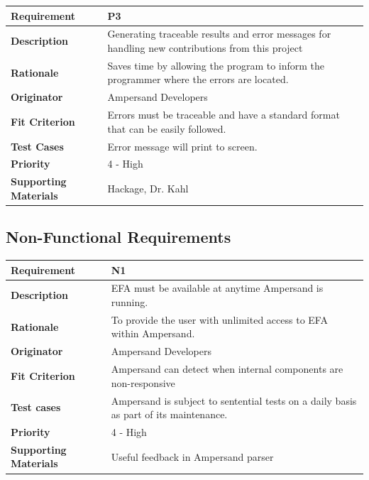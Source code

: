 \documentclass[12pt]{report}
\begin{document}
{\setlength{\tabcolsep}{6pt} %
    \begin{tabularx}{\textwidth}{>{\bfseries}C{3cm}X}
        Requirement & P3 \\ 
        \midrule
        \endhead
        Description  & Generating traceable results and error messages for 
        handling new contributions from this project
        \\	Rationale & Saves time by allowing the program to inform the 
        programmer where the errors are located.
        \\	Originator & Ampersand Developers
        \\	Fit Criterion & Errors must be traceable and have a standard format 
        that can be easily followed.
        \\ Test Cases & Error message will print to screen.
        \\	Priority & 4 - High
        \\	Supporting Materials & Hackage, Dr. Kahl
        \vspace{12pt}
    \end{tabularx}
}

\subsection{Non-Functional Requirements}
{\setlength{\tabcolsep}{6pt} %
\begin{tabularx}{\textwidth}{>{\bfseries}C{3cm}X}
Requirement & N1 \\ 
\midrule
\endhead
Description  & EFA must be available at anytime Ampersand is running.
\\	Rationale & To provide the user with unlimited access to EFA within 
Ampersand.
\\	Originator & Ampersand Developers
\\	Fit Criterion & Ampersand can detect when internal components are 
non-responsive
\\ Test cases & Ampersand is subject to sentential tests on a daily basis as 
part of its maintenance.   
\\	Priority & 4 - High
\\	Supporting Materials & Useful feedback in Ampersand parser \cite{SB2011}
\vspace{12pt}
\end{tabularx}
}
\end{document}
